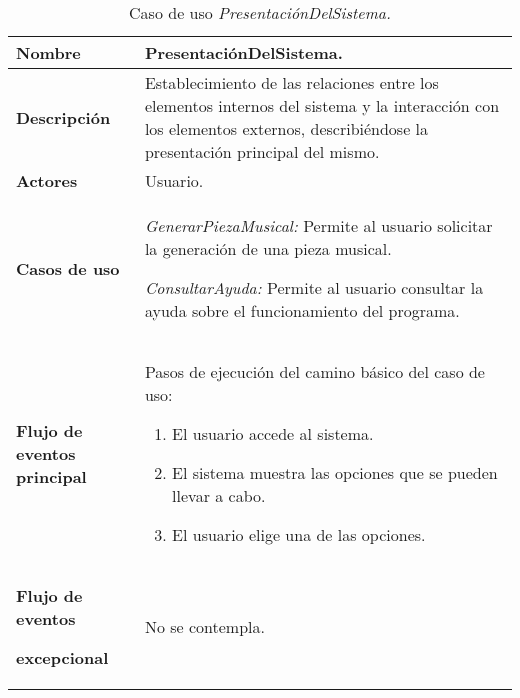 \begin{longtable}{|>{\columncolor[rgb]{0.75,0.75,0.75}}p{3cm}|p{11cm}|}
\caption{Caso de uso \emph{PresentaciónDelSistema.}} \\
\hline \centerline{\textcolor[rgb]{1.00,1.00,1.00}{\textbf{\small Nombre}}} & {\small PresentaciónDelSistema.}
\\
\hline \centerline{\textcolor[rgb]{1.00,1.00,1.00}{\textbf{\small
Descripción}}} & {\small Establecimiento de las relaciones entre los elementos internos del sistema y la interacción con los elementos externos, describiéndose la presentación principal del mismo.}
\\
\hline
\centerline{\textcolor[rgb]{1.00,1.00,1.00}{\textbf{\small
Actores}}}
&
{\small Usuario.}
\\
\hline
\begin{center}
\textcolor[rgb]{1.00,1.00,1.00}{\textbf{\small Casos de uso}}
\end{center}
\begin{center}

\end{center}
&

{\small \emph{GenerarPiezaMusical:} Permite al usuario solicitar la generación de una pieza musical.}

{\small \emph{ConsultarAyuda:} Permite al usuario consultar la ayuda
sobre el funcionamiento del programa.}
\\
\hline
\begin{center}
\end{center}
\begin{center}
\textcolor[rgb]{1.00,1.00,1.00}{\textbf{\small Flujo de eventos
principal}}
\end{center}
&
{\small Pasos de ejecución del camino básico del caso de uso:}

{\small
\begin{enumerate}
    \item El usuario accede al sistema.

    \item El sistema muestra las opciones que se pueden llevar a cabo.

    \item El usuario elige una de las opciones.
\end{enumerate}
}
\\
\hline \centerline{\textcolor[rgb]{1.00,1.00,1.00}{\textbf{\small
Flujo de eventos}}}
\centerline{\textcolor[rgb]{1.00,1.00,1.00}{\textbf{\small
excepcional}}} & {\small No se contempla.}
\\
\hline
\end{longtable}